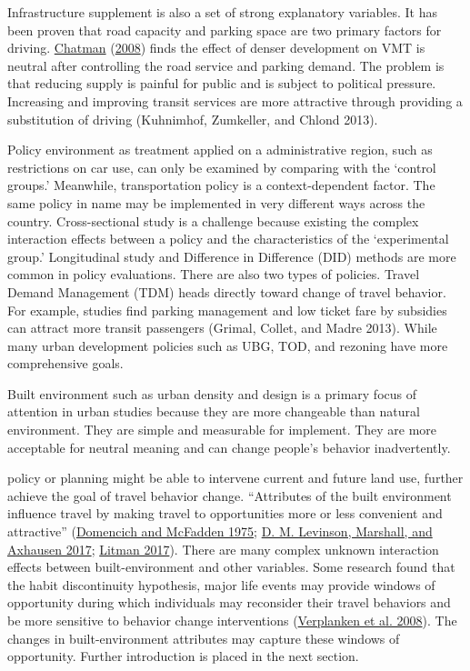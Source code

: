\documentclass[
  11pt,
  openany]{memoir}
\begin{document}
Infrastructure supplement is also a set of strong explanatory variables. It has been proven that road capacity and parking space are two primary factors for driving.
\protect\hyperlink{ref-chatmanDeconstructingDevelopmentDensity2008}{Chatman} (\protect\hyperlink{ref-chatmanDeconstructingDevelopmentDensity2008}{2008}) finds the effect of denser development on VMT is neutral after controlling the road service and parking demand.
The problem is that reducing supply is painful for public and is subject to political pressure. Increasing and improving transit services are more attractive through providing a substitution of driving (Kuhnimhof, Zumkeller, and Chlond 2013).

Policy environment as treatment applied on a administrative region, such as restrictions on car use, can only be examined by comparing with the `control groups.' Meanwhile, transportation policy is a context-dependent factor. The same policy in name may be implemented in very different ways across the country. Cross-sectional study is a challenge because existing the complex interaction effects between a policy and the characteristics of the `experimental group.' Longitudinal study and Difference in Difference (DID) methods are more common in policy evaluations. There are also two types of policies. Travel Demand Management (TDM) heads directly toward change of travel behavior. For example, studies find parking management and low ticket fare by subsidies can attract more transit passengers (Grimal, Collet, and Madre 2013). While many urban development policies such as UBG, TOD, and rezoning have more comprehensive goals.

Built environment such as urban density and design is a primary focus of attention in urban studies because they are more changeable than natural environment. They are simple and measurable for implement. They are more acceptable for neutral meaning and can change people's behavior inadvertently.

policy or planning might be able to intervene current and future land use, further achieve the goal of travel behavior change. ``Attributes of the built environment influence travel by making travel to opportunities more or less convenient and attractive'' (\protect\hyperlink{ref-domencichURBANTRAVELDEMAND1975}{Domencich and McFadden 1975}; \protect\hyperlink{ref-levinsonElementsAccessTransport2017}{D. M. Levinson, Marshall, and Axhausen 2017}; \protect\hyperlink{ref-litmanHowLandUse2017}{Litman 2017}). There are many complex unknown interaction effects between built-environment and other variables. Some research found that the habit discontinuity hypothesis, major life events may provide windows of opportunity during which individuals may reconsider their travel behaviors and be more sensitive to behavior change interventions (\protect\hyperlink{ref-verplankenContextChangeTravel2008}{Verplanken et al. 2008}). The changes in built-environment attributes may capture these windows of opportunity. Further introduction is placed in the next section.
\end{document}
